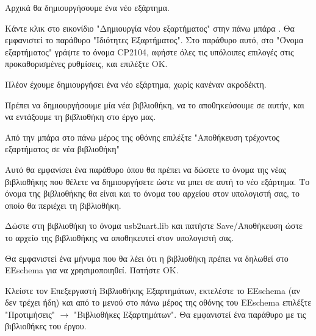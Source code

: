 \documentclass[a4paper]{article}
\begin{document}
\begin{figure}
  \begin{center}
    \label{fig:kicad-main}
  \end{center}
\end{figure}

Αρχικά θα δημιουργήσουμε ένα νέο εξάρτημα.

Κάντε κλικ στο εικονίδιο "Δημιουργία νέου εξαρτήματος" στην πάνω μπάρα %
. Θα εμφανιστεί το παράθυρο "Ιδιότητες Εξαρτήματος". Στο παράθυρο αυτό, στο "Όνομα εξαρτήματος" γράψτε το όνομα \textenglish{CP2104}, αφήστε όλες τις υπόλοιπες επιλογές στις προκαθορισμένες ρυθμίσεις, και επιλέξτε ΟΚ.

\begin{figure}
  \begin{center}
    \label{fig:kicad-main}
  \end{center}
\end{figure}

Πλέον έχουμε δημιουργήσει ένα νέο εξάρτημα, χωρίς κανέναν ακροδέκτη. 

Πρέπει να δημιουργήσουμε μία νέα βιβλιοθήκη, να το αποθηκεύσουμε σε αυτήν, και να εντάξουμε τη βιβλιοθήκη στο έργο μας.

Από την μπάρα στο πάνω μέρος της οθόνης επιλέξτε "Αποθήκευση τρέχοντος εξαρτήματος σε νέα βιβλιοθήκη" %

Αυτό θα εμφανίσει ένα παράθυρο όπου θα πρέπει να δώσετε το όνομα της νέας βιβλιοθήκης που θέλετε να δημιουργήσετε ώστε να μπει σε αυτή το νέο εξάρτημα. Το όνομα της βιβλιοθήκης θα είναι και το όνομα του αρχείου στον υπολογιστή σας, το οποίο θα περιέχει τη βιβλιοθήκη. 

Δώστε στη βιβλιοθήκη το όνομα \textenglish{usb2uart.lib} και πατήστε Save/Αποθήκευση ώστε το αρχείο της βιβλιοθήκης να αποθηκευτεί στον υπολογιστή σας. 

Θα εμφανιστεί ένα μήνυμα που θα λέει ότι η βιβλιοθήκη πρέπει να δηλωθεί στο \textenglish{EEschema} για να χρησιμοποιηθεί. Πατήστε ΟΚ.

Κλείστε τον Επεξεργαστή Βιβλιοθήκης Εξαρτημάτων, εκτελέστε το \textenglish{EEschema} (αν δεν τρέχει ήδη) και από το μενού στο πάνω μέρος της οθόνης του \textenglish{EEschema} επιλέξτε "Προτιμήσεις" $\rightarrow$ "Βιβλιοθήκες Εξαρτημάτων". Θα εμφανιστεί ένα παράθυρο με τις βιβλιοθήκες του έργου. 
\end{document}
